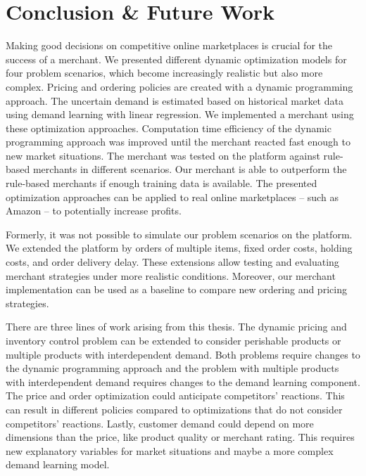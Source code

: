 
\chapter{Conclusion \& Future Work}

Making good decisions on competitive online marketplaces is crucial for the success of a merchant.
We presented different dynamic optimization models for four problem scenarios, which become increasingly realistic but also more complex.
Pricing and ordering policies are created with a dynamic programming approach.
The uncertain demand is estimated based on historical market data using demand learning with linear regression.
We implemented a merchant using these optimization approaches.
Computation time efficiency of the dynamic programming approach was improved until the merchant reacted fast enough  to new market situations.
The merchant was tested on the \pricewars platform against rule-based merchants in different scenarios.
Our merchant is able to outperform the rule-based merchants if enough training data is available.
The presented optimization approaches can be applied to real online marketplaces -- such as Amazon -- to potentially increase profits.

Formerly, it was not possible to simulate our problem scenarios on the \pricewars platform.
We extended the platform by orders of multiple items, fixed order costs, holding costs, and order delivery delay.
These extensions allow testing and evaluating merchant strategies under more realistic conditions.
Moreover, our merchant implementation can be used as a baseline to compare new ordering and pricing strategies.

There are three lines of work arising from this thesis.
The dynamic pricing and inventory control problem can be extended to consider perishable products or multiple products with interdependent demand.
Both problems require changes to the dynamic programming approach and the problem with multiple products with interdependent demand requires changes to the demand learning component.
The price and order optimization could anticipate competitors' reactions.
This can result in different policies compared to optimizations that do not consider competitors' reactions.
Lastly, customer demand could depend on more dimensions than the price, like product quality or merchant rating.
This requires new explanatory variables for market situations and maybe a more complex demand learning model.



